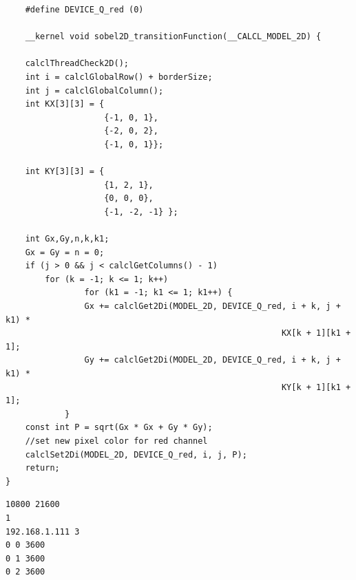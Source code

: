 \begin{lstlisting}
    #define DEVICE_Q_red (0)
    
    __kernel void sobel2D_transitionFunction(__CALCL_MODEL_2D) {
    
    calclThreadCheck2D();
    int i = calclGlobalRow() + borderSize;
    int j = calclGlobalColumn();
    int KX[3][3] = {
                    {-1, 0, 1},
                    {-2, 0, 2},
                    {-1, 0, 1}};
    
    int KY[3][3] = {
                    {1, 2, 1},
                    {0, 0, 0},
                    {-1, -2, -1} };
    
    int Gx,Gy,n,k,k1;
    Gx = Gy = n = 0;
    if (j > 0 && j < calclGetColumns() - 1)
        for (k = -1; k <= 1; k++)
                for (k1 = -1; k1 <= 1; k1++) {
                Gx += calclGet2Di(MODEL_2D, DEVICE_Q_red, i + k, j + k1) *
                                                        KX[k + 1][k1 + 1];
                Gy += calclGet2Di(MODEL_2D, DEVICE_Q_red, i + k, j + k1) *
                                                        KY[k + 1][k1 + 1];
            }
    const int P = sqrt(Gx * Gx + Gy * Gy);
    //set new pixel color for red channel
    calclSet2Di(MODEL_2D, DEVICE_Q_red, i, j, P);
    return;
}

\end{lstlisting}


\begin{lstlisting}[float]
10800 21600
1
192.168.1.111 3
0 0 3600
0 1 3600
0 2 3600
\end{lstlisting}



